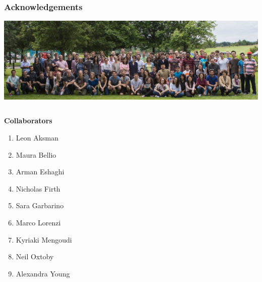 \documentclass[8pt,xcolor=table]{beamer}
\begin{document}
\begin{frame}[label=current]
\frametitle{Acknowledgements}

\includegraphics[width=\textwidth,trim=0 0 0 150, clip]{cmic_away_day}
 
 \begin{small}
\begin{columns}[T]
    \begin{column}{.3\textwidth}
    \textbf{Collaborators}
    \begin{enumerate}
    \item Leon Aksman
    \item Maura Bellio
     \item Arman Eshaghi
     \item Nicholas Firth
     \item Sara Garbarino
     \item Marco Lorenzi
     \item Kyriaki Mengoudi
     \item Neil Oxtoby
     \item Alexandra Young
    \end{enumerate}
    \end{column}
    

\end{columns}
\end{small}
\end{frame}
\end{document}

